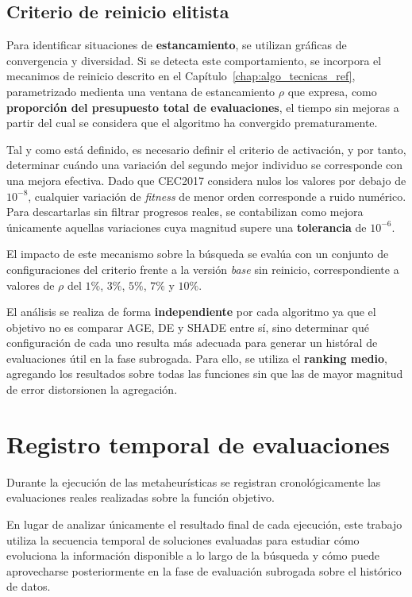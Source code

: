 \subsection{Criterio de reinicio elitista}
\label{subsec:criterio_reinicio}

Para identificar situaciones de \textbf{estancamiento}, se utilizan gráficas de convergencia y diversidad. Si se detecta este comportamiento, se incorpora el mecanimos de reinicio descrito en el Capítulo~\ref{chap:algo_tecnicas_ref}, parametrizado medienta una ventana de estancamiento $\rho$ que expresa, como \textbf{proporción del presupuesto total de evaluaciones}, el tiempo sin mejoras a partir del cual se considera que el algoritmo ha convergido prematuramente.

Tal y como está definido, es necesario definir el criterio de activación, y por tanto, determinar cuándo una variación del segundo mejor individuo se corresponde con una mejora efectiva. Dado que CEC2017 considera nulos los valores por debajo de $10^{-8}$, cualquier variación de \textit{fitness} de menor orden corresponde a ruido numérico. Para descartarlas sin filtrar progresos reales, se contabilizan como mejora únicamente aquellas variaciones cuya magnitud supere una \textbf{tolerancia} de $10^{-6}$.

El impacto de este mecanismo sobre la búsqueda se evalúa con un conjunto de configuraciones del criterio frente a la versión \textit{base} sin reinicio, correspondiente a valores de $\rho$ del $1\%$, $3\%$, $5\%$, $7\%$ y $10\%$.

El análisis se realiza de forma \textbf{independiente} por cada algoritmo ya que el objetivo no es comparar AGE, DE y SHADE entre sí, sino determinar qué configuración de cada uno resulta más adecuada para generar un históral de evaluaciones útil en la fase subrogada. Para ello, se utiliza el \textbf{ranking medio}, agregando los resultados sobre todas las funciones sin que las de mayor magnitud de error distorsionen la agregación.

\section{Registro temporal de evaluaciones}
\label{sec:generacion_trayectorias}

Durante la ejecución de las metaheurísticas se registran cronológicamente las
evaluaciones reales realizadas sobre la función objetivo.

En lugar de analizar únicamente el resultado final de cada ejecución, este trabajo utiliza la secuencia temporal de soluciones evaluadas para estudiar cómo evoluciona la información disponible a lo largo de la búsqueda y cómo puede aprovecharse posteriormente en la fase de evaluación subrogada sobre el histórico de datos.

